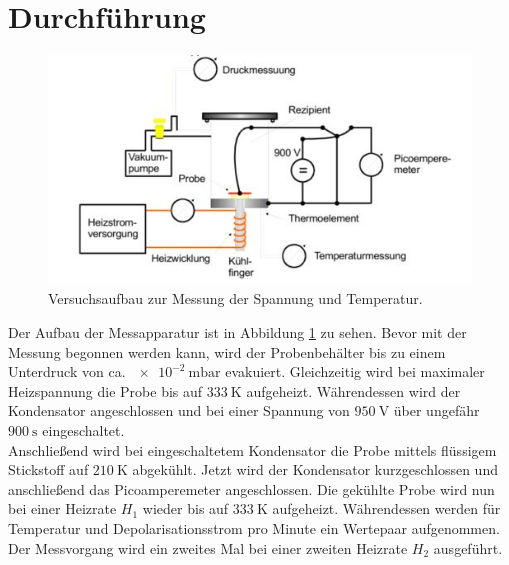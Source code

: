 \section{Durchführung}
\label{sec:Durchführung}
\begin{figure}[H]
  \centering
  \includegraphics{plots/Aufbau.JPG}
  \caption{Versuchsaufbau zur Messung der Spannung und Temperatur.\cite{Anleitung}}
  \label{fig:aufbau}
\end{figure}
Der Aufbau der Messapparatur ist in Abbildung \ref{fig:aufbau} zu sehen. Bevor mit der Messung begonnen werden kann, wird der
Probenbehälter bis zu einem Unterdruck von ca. $\SI{e-2}{\milli\bar}$ evakuiert. Gleichzeitig wird bei maximaler Heizspannung
die Probe bis auf $\SI{333}{\kelvin}$ aufgeheizt. Währendessen wird der Kondensator angeschlossen und bei einer Spannung von
$\SI{950}{\volt}$ über ungefähr $\SI{900}{\second}$ eingeschaltet.\\
Anschließend wird bei eingeschaltetem Kondensator die Probe mittels flüssigem Stickstoff auf $\SI{210}{\kelvin}$ abgekühlt.
Jetzt wird der Kondensator kurzgeschlossen und anschließend das Picoamperemeter angeschlossen. Die gekühlte Probe wird nun bei einer Heizrate $H_1$ wieder bis auf $\SI{333}{\kelvin}$ aufgeheizt.
Währendessen werden für Temperatur und Depolarisationsstrom pro Minute ein Wertepaar aufgenommen. Der Messvorgang wird ein zweites Mal bei einer zweiten Heizrate $H_2$ ausgeführt.
